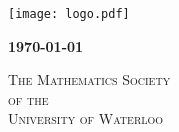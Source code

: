 \begin{titlepage}\begin{center}
\texttt{[image: logo.pdf]}

\vspace{8em}

{\Huge \scshape{\bfseries \doctype}}

\vspace{3em}

{\LARGE \bfseries \today}

\vspace{4em}

{\LARGE \scshape The Mathematics Society \\ of the \\[0.3em] University of Waterloo}

\end{center}\end{titlepage}